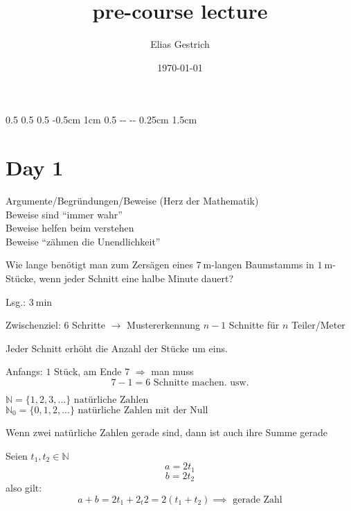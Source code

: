 \documentclass[a4paper, markcase = upper, parskip = true, fleqn]{scrartcl}
\title{pre-course lecture}
\author{Elias Gestrich}
\date{\today}
\newlength{\hmargin}
\newlength{\lmargin}
\newlength{\rmargin}
\newlength{\fmargin}
\begin{document}
\setlength{\hoffset}		{0.5\lmargin-1in}
\setlength{\voffset}		{0.5\hmargin-1in}
\setlength{\oddsidemargin}	{0.5\lmargin}
\setlength{\topmargin}		{-0.5cm}
\setlength{\headheight}		{1cm}
\setlength{\headsep}		{0.5\hmargin-0.5cm}
%
\setlength{\textheight}		{\paperheight-\hmargin-\fmargin}
\setlength{\textwidth}		{\paperwidth-\lmargin-\rmargin}
\setlength{\linewidth}		{\textwidth}
%
\setlength{\marginparsep}	{0.25cm}
\setlength{\marginparwidth}	{1.5cm}

\maketitle
\thispagestyle{empty}



\section{Day 1}
Argumente/Begründungen/Beweise (Herz der Mathematik)\\
Beweise sind ``immer wahr''\\
Beweise helfen beim verstehen\\
Beweise ``zähmen die Unendlichkeit''\par

\begin{problembox}
	Wie lange benötigt man zum Zersägen eines $\qty{7}{\meter}$-langen Baumstamms in $\qty{1}{\meter}$-Stücke, wenn jeder Schnitt eine halbe Minute dauert?\par
	Lsg.: $\qty{3}{\minute}$\par
	Zwischenziel: 6 Schritte $\rightarrow$ Mustererkennung $n-1$ Schnitte für $n$ Teiler/Meter\par
	\begin{proofbox}
		Jeder Schnitt erhöht die Anzahl der Stücke um eins.\par
		Anfangs: $1$ Stück, am Ende $7$ $\Rightarrow$ man muss \[7 - 1 = 6 \text{ Schnitte machen. usw.}\]
	\end{proofbox}
\end{problembox}

$\mathbb{N} = \{1, 2, 3, ...\} \text{ natürliche Zahlen}$\\
$\mathbb{N}_0 = \{0, 1, 2, ...\} \text{ natürliche Zahlen mit der Null}$\par

\begin{problembox}
	\begin{conjecturebox}
		Wenn zwei natürliche Zahlen gerade sind, dann ist auch ihre Summe gerade
	\end{conjecturebox}
	Seien $t_1, t_2 \in \mathbb{N}$
	\[ a = 2t_1 \]
	\[ b = 2t_2 \]
	also gilt:
	\[ a + b = 2t_1 + 2_t2 = 2(t_1+t_2) \implies \text{ gerade Zahl}\]
\end{problembox}
\end{document}
